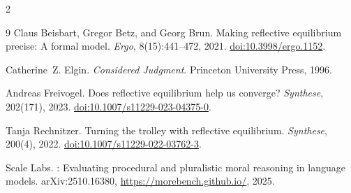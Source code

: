 \documentclass[10pt]{article}
\providecommand{\doi}[1]{\href{https://doi.org/#1}{doi:#1}}
\begin{document}
\begin{multicols}{2}
\begin{thebibliography}{9}
Claus Beisbart, Gregor Betz, and Georg Brun.
\newblock Making reflective equilibrium precise: A formal model.
\newblock \emph{Ergo}, 8(15):441--472, 2021.
\newblock \doi{10.3998/ergo.1152}.

Catherine~Z. Elgin.
\newblock \emph{Considered Judgment}.
\newblock Princeton University Press, 1996.

Andreas Freivogel.
\newblock Does reflective equilibrium help us converge?
\newblock \emph{Synthese}, 202(171), 2023.
\newblock \doi{10.1007/s11229-023-04375-0}.

Tanja Rechnitzer.
\newblock Turning the trolley with reflective equilibrium.
\newblock \emph{Synthese}, 200(4), 2022.
\newblock \doi{10.1007/s11229-022-03762-3}.

Scale Labs.
: Evaluating procedural and pluralistic moral reasoning in language models.
\newblock arXiv:2510.16380, \url{https://morebench.github.io/}, 2025.
\end{thebibliography}

\end{multicols}
\end{document}

